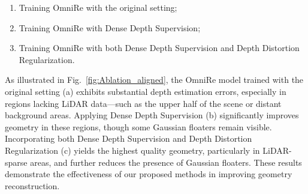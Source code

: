 \begin{enumerate}[label=(\alph*)]
\item Training OmniRe with the original setting;
\item Training OmniRe with Dense Depth Supervision;
\item Training OmniRe with both Dense Depth Supervision and Depth Distortion Regularization.
\end{enumerate}

As illustrated in Fig.~\ref{fig:Ablation_aligned}, the OmniRe model trained with the original setting (a) exhibits substantial depth estimation errors, especially in regions lacking LiDAR data—such as the upper half of the scene or distant background areas. Applying Dense Depth Supervision (b) significantly improves geometry in these regions, though some Gaussian floaters remain visible. Incorporating both Dense Depth Supervision and Depth Distortion Regularization (c) yields the highest quality geometry, particularly in LiDAR-sparse areas, and further reduces the presence of Gaussian floaters. These results demonstrate the effectiveness of our proposed methods in improving geometry reconstruction.



